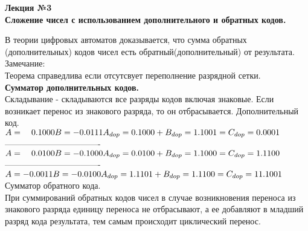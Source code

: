 



\LARGE{ \textbf {Лекция №3}}\\
\Large{ \textbf {Сложение чисел с использованием дополнительного и обратных кодов.}}


В теории цифровых автоматов доказывается, что сумма обратных (дополнительных) кодов чисел есть обратный(дополнительный) от результата.\\
Замечание:\\
Теорема справедлива если отсутсвует переполнение разрядной сетки.\\

\Large{ \textbf {Сумматор дополнительных кодов.}} \\
Складывание - складываются все разряды кодов включая знаковые. Если возникает перенос из знакового разряда, то он отбрасывается.
Дополнительный код.\\
$
A = \quad 0.1000 \\
B = -0.0111 \\
A_{dop} = 0.1000 \\
+ \\
B_{dop} = 1.1001 \\
=\\
C_{dop} = 0.0001
$\\
----------------------------------\\
$
A = \quad 0.0100 \\
B =-0.1000  \\
A_{dop} = 0.0100  \\
+  \\
B_{dop} = 1.1000 \\
=  \\
C_{dop} = 1.1100
$\\
----------------------------------\\
$
A =-0.0011 \\
B =-0.0100  \\
A_{dop} = 1.1101  \\
+  \\
B_{dop} = 1.1100 \\
=  \\
C_{dop} = 11.1001  \\
$
Сумматор обратного кода.\\
При суммирований обратных кодов чисел в случае возникновения переноса из знакового разряда единицу переноса не отбрасывают, а ее добавляют в младший разряд кода результата, тем самым происходит циклический перенос.\\
